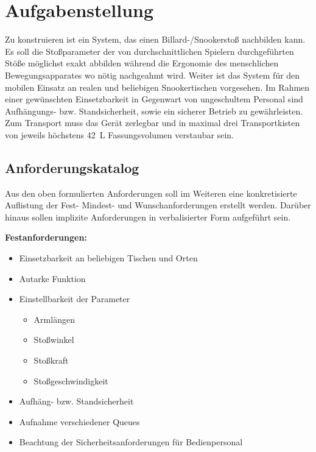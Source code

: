 \chapter{Aufgabenstellung}\label{chap:Aufgabenstellung}

	Zu konstruieren ist ein System, das einen Billard-/Snookerstoß nachbilden kann.
	Es soll die Stoßparameter der von durchschnittlichen Spielern durchgeführten Stöße möglichst exakt abbilden während die Ergonomie des menschlichen Bewegungsapparates wo nötig nachgeahmt wird.
	Weiter ist das System für den mobilen Einsatz an realen und beliebigen Snookertischen vorgesehen. Im Rahmen einer gewünschten Einsetzbarkeit in Gegenwart von ungeschultem Personal sind Aufhängungs- bzw. Standsicherheit, sowie ein sicherer Betrieb zu gewährleisten.
	Zum Transport muss das Gerät zerlegbar und in maximal drei Transportkisten von jeweils höchstens \SI{42}{L} Fassungsvolumen verstaubar sein.

	\section{Anforderungskatalog}
		Aus den oben formulierten Anforderungen soll im Weiteren eine konkretisierte Auflistung der Fest- Mindest- und Wunschanforderungen erstellt werden.
		Darüber hinaus sollen implizite Anforderungen in verbalisierter Form aufgeführt sein.\par\medskip

		\textbf{Festanforderungen:}
		\begin{itemize}
			\item Einsetzbarkeit an beliebigen Tischen und Orten
			\item Autarke Funktion
			\item Einstellbarkeit der Parameter
			\begin{itemize}
				\item Armlängen
				\item Stoßwinkel
				\item Stoßkraft
				\item Stoßgeschwindigkeit
			\end{itemize}
			\item Aufhäng- bzw. Standsicherheit
			\item Aufnahme verschiedener Queues
			\item Beachtung der Sicherheitsanforderungen für Bedienpersonal
		\end{itemize}


